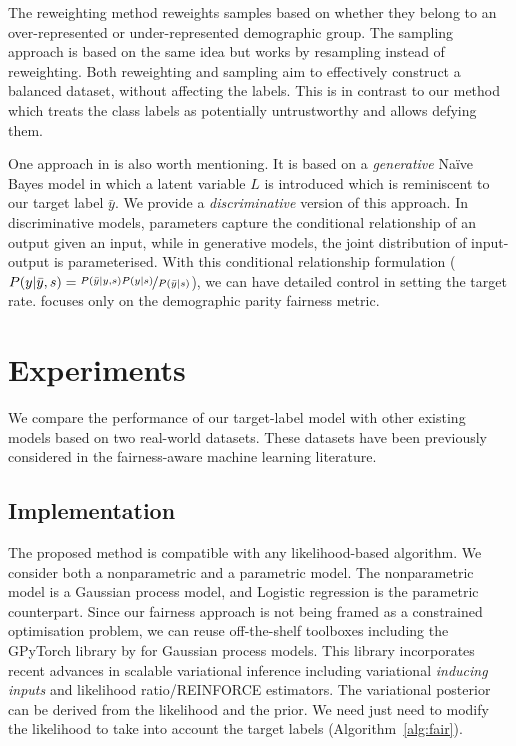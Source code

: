 The reweighting method reweights samples based on whether they belong to an over-represented or under-represented demographic group.
The sampling approach is based on the same idea but works by resampling instead of reweighting.
Both reweighting and sampling aim to effectively construct a balanced dataset, without affecting the labels.
This is in contrast to our method which treats the class labels as potentially untrustworthy and allows defying them.

One approach in \citet{calders2010three} is also worth mentioning.
It is based on a \emph{generative} Na\"{i}ve Bayes model in which a latent variable $L$ is introduced
which is reminiscent to our target label $\bar{y}$.
We provide a \emph{discriminative} version of this approach. 
In discriminative models, parameters capture the conditional relationship of an output given an input,
while in generative models, the joint distribution of input-output is parameterised. 
With this conditional relationship formulation
($P(y|\bar{y}, s) = \nicefrac{P(\bar{y}|y, s) P(y|s)}{P(\bar{y}|s)} $),
we can have detailed control in setting the target rate.
\citet{calders2010three} focuses only on the demographic parity fairness metric.
\section{Experiments}\label{sec:experiments}
We compare the performance of our target-label model with other existing models based on two real-world datasets.
These datasets have been previously considered in the fairness-aware machine learning literature.

\subsection{Implementation}
The proposed method is compatible with any likelihood-based algorithm. 
%
We consider both a nonparametric and a parametric model.
The nonparametric model is a Gaussian process model, and Logistic regression is the parametric counterpart.
Since our fairness approach is not being framed as a constrained optimisation problem,
we can reuse off-the-shelf toolboxes including the GPyTorch library by \citet{gardner2018gpytorch} for Gaussian process models.
This library incorporates recent advances in scalable variational inference including variational \emph{inducing inputs} and likelihood ratio/REINFORCE estimators.
The variational posterior can be derived from the likelihood and the prior.
We need just need to modify the likelihood to take into account the target labels (Algorithm~\ref{alg:fair}).

